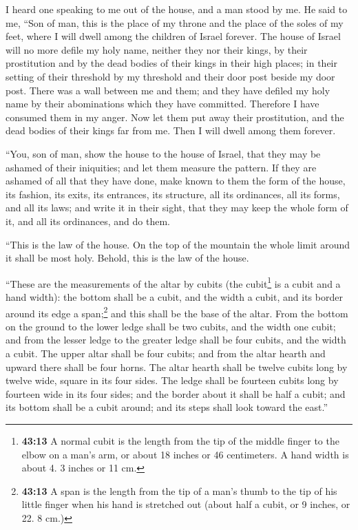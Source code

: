 I heard one speaking to me out of the house, and a man
stood by me.  He said to me, ``Son of man, this is the
place of my throne and the place of the soles of my feet, where I will
dwell among the children of Israel forever. The house of Israel will no
more defile my holy name, neither they nor their kings, by their
prostitution and by the dead bodies of their kings in their high places;
 in their setting of their threshold by my threshold and
their door post beside my door post. There was a wall between me and
them; and they have defiled my holy name by their abominations which
they have committed. Therefore I have consumed them in my anger.
 Now let them put away their prostitution, and the dead
bodies of their kings far from me. Then I will dwell among them forever.

 ``You, son of man, show the house to the house of
Israel, that they may be ashamed of their iniquities; and let them
measure the pattern.  If they are ashamed of all that
they have done, make known to them the form of the house, its fashion,
its exits, its entrances, its structure, all its ordinances, all its
forms, and all its laws; and write it in their sight, that they may keep
the whole form of it, and all its ordinances, and do them.

 ``This is the law of the house. On the top of the
mountain the whole limit around it shall be most holy. Behold, this is
the law of the house.

 ``These are the measurements of the altar by cubits (the
cubit\footnote{\textbf{43:13} A normal cubit is the length from the tip
  of the middle finger to the elbow on a man's arm, or about 18 inches
  or 46 centimeters. A hand width is about 4. 3 inches or 11 cm.} is a
cubit and a hand width): the bottom shall be a cubit, and the width a
cubit, and its border around its edge a span;\footnote{\textbf{43:13} A
  span is the length from the tip of a man's thumb to the tip of his
  little finger when his hand is stretched out (about half a cubit, or 9
  inches, or 22. 8 cm.)} and this shall be the base of the altar.
 From the bottom on the ground to the lower ledge shall
be two cubits, and the width one cubit; and from the lesser ledge to the
greater ledge shall be four cubits, and the width a cubit.
 The upper altar shall be four cubits; and from the altar
hearth and upward there shall be four horns.  The altar
hearth shall be twelve cubits long by twelve wide, square in its four
sides.  The ledge shall be fourteen cubits long by
fourteen wide in its four sides; and the border about it shall be half a
cubit; and its bottom shall be a cubit around; and its steps shall look
toward the east.''

